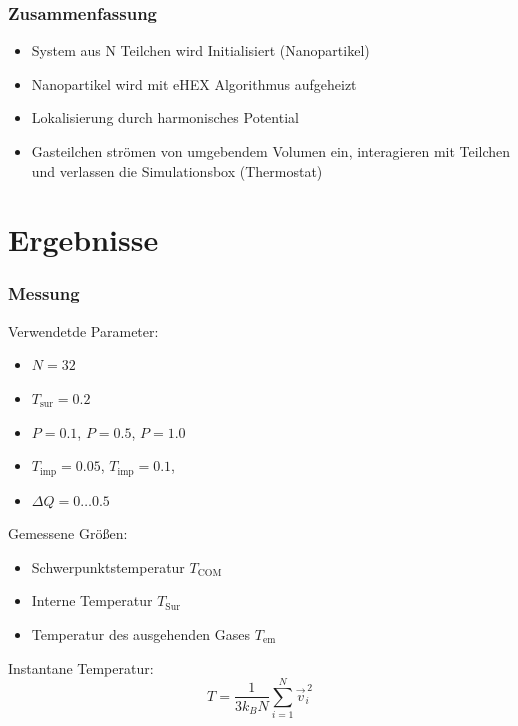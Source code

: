 \documentclass{beamer}
\begin{document}
\begin{frame}
\frametitle{Zusammenfassung}
\begin{itemize}
\item System aus N Teilchen wird Initialisiert (Nanopartikel)
\item Nanopartikel wird mit eHEX Algorithmus aufgeheizt
\item Lokalisierung durch harmonisches Potential
\item Gasteilchen strömen von umgebendem Volumen ein, interagieren mit Teilchen und verlassen die Simulationsbox (Thermostat)
\end{itemize}
\end{frame}

\section{Ergebnisse}

\begin{frame}
\frametitle{Messung}
Verwendetde Parameter:
\begin{itemize}
\item $N = 32$
\item $T_\text{sur} = 0.2$
\item $P=0.1$, $P=0.5$, $P=1.0$
\item $T_\text{imp} = 0.05$, $T_\text{imp} = 0.1$, 
\item $\Delta Q = 0 \ldots 0.5$
\end{itemize}
Gemessene Größen:
\begin{itemize}
\item Schwerpunktstemperatur $T_\text{COM}$
\item Interne Temperatur $T_\text{Sur}$
\item Temperatur des ausgehenden Gases $T_\text{em}$
\end{itemize}

Instantane Temperatur:
\begin{equation}
    T = \frac{1}{3 k_B N} \sum_{i=1}^N \vec{v}_i^{\, 2}
\end{equation}

\end{frame}
\end{document}
